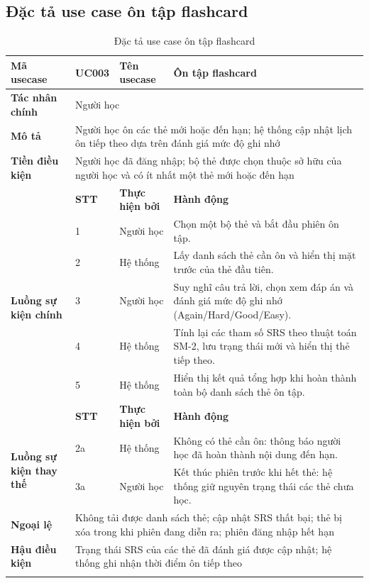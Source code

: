\documentclass[../DoAn.tex]{subfiles}
\begin{document}
\subsection{Đặc tả use case ôn tập flashcard}
\label{subsection:2.3.2}

{\footnotesize\singlespacing
\begin{longtable}{|p{2.8cm}|p{1.0cm}|p{2.2cm}|p{7.5cm}|}
\hline
\textbf{Mã usecase} & \textbf{UC003} & \textbf{Tên usecase} & \multicolumn{1}{l|}{Ôn tập flashcard} \\
\hline
\textbf{Tác nhân chính} & \multicolumn{3}{p{11.1cm}|}{Người học} \\
\hline
\textbf{Mô tả} & \multicolumn{3}{p{11.1cm}|}{Người học ôn các thẻ mới hoặc đến hạn; hệ thống cập nhật lịch ôn tiếp theo dựa trên đánh giá mức độ ghi nhớ} \\
\hline
\textbf{Tiền điều kiện} & \multicolumn{3}{p{11.1cm}|}{Người học đã đăng nhập; bộ thẻ được chọn thuộc sở hữu của người học và có ít nhất một thẻ mới hoặc đến hạn} \\
\hline
 & \textbf{STT} & \textbf{Thực hiện bởi} & \textbf{Hành động} \\
\hline
\multirow{5}{2.8cm}{\textbf{Luồng sự kiện chính}} & 1 & Người học & Chọn một bộ thẻ và bắt đầu phiên ôn tập. \\
\cline{2-4}
 & 2 & Hệ thống & Lấy danh sách thẻ cần ôn và hiển thị mặt trước của thẻ đầu tiên. \\
\cline{2-4}
 & 3 & Người học & Suy nghĩ câu trả lời, chọn xem đáp án và đánh giá mức độ ghi nhớ (Again/Hard/Good/Easy). \\
\cline{2-4}
 & 4 & Hệ thống & Tính lại các tham số SRS theo thuật toán SM-2, lưu trạng thái mới và hiển thị thẻ tiếp theo. \\
\cline{2-4}
 & 5 & Hệ thống & Hiển thị kết quả tổng hợp khi hoàn thành toàn bộ danh sách thẻ ôn tập. \\
\hline
 & \textbf{STT} & \textbf{Thực hiện bởi} & \textbf{Hành động} \\
\hline
\multirow{2}{2.8cm}{\textbf{Luồng sự kiện thay thế}} & 2a & Hệ thống & Không có thẻ cần ôn: thông báo người học đã hoàn thành nội dung đến hạn. \\
\cline{2-4}
 & 3a & Người học & Kết thúc phiên trước khi hết thẻ: hệ thống giữ nguyên trạng thái các thẻ chưa học. \\
\hline
\textbf{Ngoại lệ} & \multicolumn{3}{p{11.1cm}|}{Không tải được danh sách thẻ; cập nhật SRS thất bại; thẻ bị xóa trong khi phiên đang diễn ra; phiên đăng nhập hết hạn} \\
\hline
\textbf{Hậu điều kiện} & \multicolumn{3}{p{11.1cm}|}{Trạng thái SRS của các thẻ đã đánh giá được cập nhật; hệ thống ghi nhận thời điểm ôn tiếp theo} \\
\hline
\caption{Đặc tả use case ôn tập flashcard}
\label{table:UC003}\\
\end{longtable}
}
\end{document}
